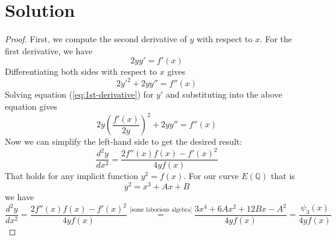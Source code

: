 \documentclass[12pt]{article}
\begin{document}
\section*{Solution}
\begin{proof}

First, we compute the second derivative of $y$ with respect to $x$. For the first derivative, we have
\begin{equation}
    2yy' = f'(x)
    \label{eq:1st-derivative}
\end{equation}
Differentiating both sides with respect to $x$ gives
\begin{equation}
    2y'^2 + 2yy'' = f''(x) 
\end{equation}
Solving equation (\ref{eq:1st-derivative}) for $y'$ and substituting into the above equation gives
\begin{equation}
    2y \left( \frac{f'(x)}{2y} \right)^2 + 2yy'' = f''(x)
\end{equation}
Now we can simplify the left-hand side to get the desired result:
\begin{equation}
    \frac{d^2 y}{dx^2} = \frac{2 f''(x)f(x) - f'(x)^2}{4 y f(x)}
\end{equation}
That holds for any implicit function $y^2 = f(x)$. For our curve $E(\mathbb{Q})$ that is
\begin{equation}
    y^2 = x^3 + Ax + B  
\end{equation}
we have
\begin{equation}
    \frac{d^2 y}{dx^2} = \frac{2 f''(x)f(x) - f'(x)^2}{4 y f(x)} \stackrel{\text{[some laborious algebra]}}{=} \frac{3x^4 + 6Ax^2 + 12Bx - A^2}{4 y f(x)} = \frac{\psi_3(x)}{4 y f(x)}
\end{equation}


\end{proof}
\end{document}
